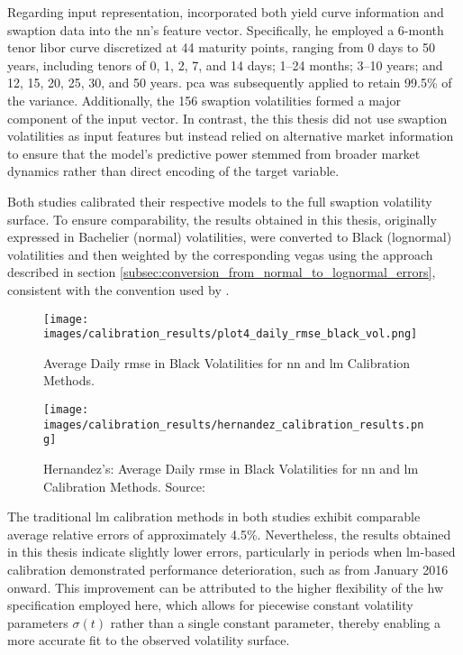 Regarding input representation, \textcite{hernandez2016model} incorporated both yield curve information and swaption data into the \ac{nn}'s feature vector. Specifically, he employed a 6-month tenor \ac{libor} curve discretized at 44 maturity points, ranging from 0 days to 50 years, including tenors of 0, 1, 2, 7, and 14 days; 1--24 months; 3--10 years; and 12, 15, 20, 25, 30, and 50 years. \ac{pca} was subsequently applied to retain 99.5\% of the variance. Additionally, the 156 swaption volatilities formed a major component of the input vector. In contrast, the this thesis did not use swaption volatilities as input features but instead relied on alternative market information to ensure that the model's predictive power stemmed from broader market dynamics rather than direct encoding of the target variable.

Both studies calibrated their respective models to the full swaption volatility surface. To ensure comparability, the results obtained in this thesis, originally expressed in Bachelier (normal) volatilities, were converted to Black (lognormal) volatilities and then weighted by the corresponding vegas using the approach described in section \ref{subsec:conversion_from_normal_to_lognormal_errors}, consistent with the convention used by \textcite{hernandez2016model}.

\begin{figure}[H]
	\centering
	\texttt{[image: images/calibration\_results/plot4\_daily\_rmse\_black\_vol.png]}
	\caption{Average Daily \ac{rmse} in Black Volatilities for \ac{nn} and \ac{lm} Calibration Methods.}
	\label{fig:daily_rmse_black_vol}
\end{figure}

\begin{figure}[H]
	\centering
	\texttt{[image: images/calibration\_results/hernandez\_calibration\_results.png]}
	\caption{Hernandez's: Average Daily \ac{rmse} in Black Volatilities for \ac{nn} and \ac{lm} Calibration Methods. Source: \parencite[figure~3]{hernandez2016model}}
	\label{fig:daily_rmse_black_vol_herandez}
\end{figure}


The traditional \ac{lm} calibration methods in both studies exhibit comparable average relative errors of approximately 4.5\%. Nevertheless, the results obtained in this thesis indicate slightly lower errors, particularly in periods when \textcite{hernandez2016model} \ac{lm}-based calibration demonstrated performance deterioration, such as from January 2016 onward. This improvement can be attributed to the higher flexibility of the \ac{hw} specification employed here, which allows for piecewise constant volatility parameters $\sigma(t)$ rather than a single constant parameter, thereby enabling a more accurate fit to the observed volatility surface.

